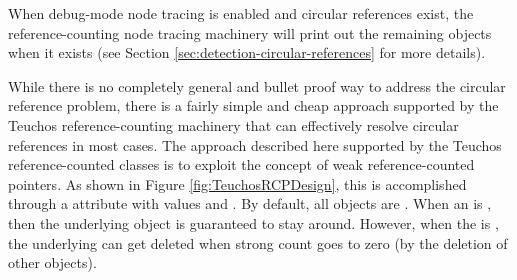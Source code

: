 \documentclass[pdf,ps2pdf,11pt]{SANDreport}
\begin{document}
When debug-mode node tracing is enabled and circular references exist,
the reference-counting node tracing machinery will print out the
remaining {} objects when it exists (see Section
{}\ref{sec:detection-circular-references} for more details).

While there is no completely general and bullet proof way to address
the circular reference problem, there is a fairly simple and cheap
approach supported by the Teuchos reference-counting machinery that
can effectively resolve circular references in most cases.  The
approach described here supported by the Teuchos reference-counted
classes is to exploit the concept of weak reference-counted pointers.
As shown in Figure {}\ref{fig:TeuchosRCPDesign}, this is accomplished
through a {} attribute with values {} and
{}.  By default, all {} objects are {}.
When an {} is {}, then the underlying
{} object is guaranteed to stay around.  However, when
the {} is {}, the underlying {} can
get deleted when strong count goes to zero (by the deletion of other
{} {} objects).
\end{document}
